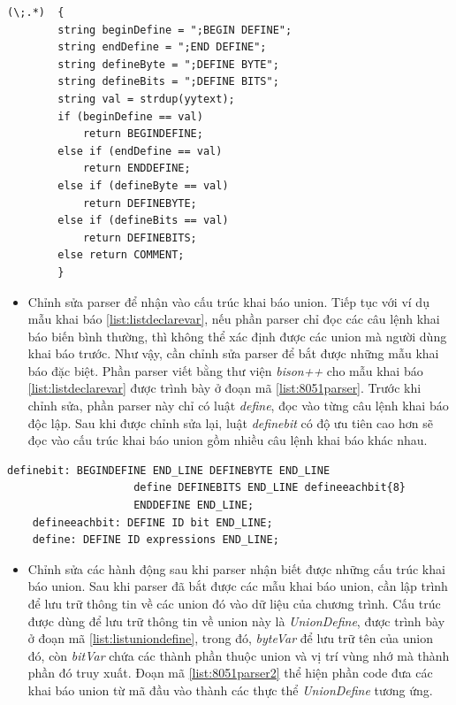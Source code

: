 \begin{changemargin}{0cm}{0cm} 
	\begin{lstlisting}[caption={Phần lexer được chỉnh sửa để nhận biết các chú thích đặc biệt},label={list:8051lexer}]
	(\;.*)  { 
		string beginDefine = ";BEGIN DEFINE";
		string endDefine = ";END DEFINE";
		string defineByte = ";DEFINE BYTE";
		string defineBits = ";DEFINE BITS";
		string val = strdup(yytext);
		if (beginDefine == val)
			return BEGINDEFINE;
		else if (endDefine == val)
			return ENDDEFINE;
		else if (defineByte == val)
			return DEFINEBYTE;
		else if (defineBits == val)
			return DEFINEBITS;
		else return COMMENT;
		}
	\end{lstlisting}

\end{changemargin} 
\begin{itemize}
	\item Chỉnh sửa parser để nhận vào cấu trúc khai báo union. Tiếp tục với ví dụ mẫu khai báo \ref{list:listdeclarevar}, nếu phần parser chỉ đọc các câu lệnh khai báo biến bình thường, thì không thể xác định được các union mà người dùng khai báo trước. Như vậy, cần chỉnh sửa parser để bắt được những mẫu khai báo đặc biệt. Phần parser viết bằng thư viện \textit{bison++} cho mẫu khai báo \ref{list:listdeclarevar} được trình bày ở đoạn mã \ref{list:8051parser}. Trước khi chỉnh sửa, phần parser này chỉ có luật \textit{define}, đọc vào từng câu lệnh khai báo độc lập. Sau khi được chỉnh sửa lại, luật \textit{definebit} có độ ưu tiên cao hơn sẽ đọc vào cấu trúc khai báo union gồm nhiều câu lệnh khai báo khác nhau.
\end{itemize}
\begin{changemargin}{0cm}{0cm} 
	\begin{lstlisting}[caption={Đoạn mã parser nhận biết các mẫu khai báo union},label={list:8051parser}]
	definebit: BEGINDEFINE END_LINE DEFINEBYTE END_LINE 
					define DEFINEBITS END_LINE defineeachbit{8} 
					ENDDEFINE END_LINE;
	defineeachbit: DEFINE ID bit END_LINE;
	define:	DEFINE ID expressions END_LINE;
	\end{lstlisting}
\end{changemargin} 
\begin{itemize}
	\item Chỉnh sửa các hành động sau khi parser nhận biết được những cấu trúc khai báo union. Sau khi parser đã bắt được các mẫu khai báo union, cần lập trình để lưu trữ thông tin về các union đó vào dữ liệu của chương trình. Cấu trúc được dùng để lưu trữ thông tin về union này là \textit{UnionDefine}, được trình bày ở đoạn mã \ref{list:listuniondefine}, trong đó, \textit{byteVar} để lưu trữ tên của union đó, còn \textit{bitVar} chứa các thành phần thuộc union và vị trí vùng nhớ mà thành phần đó truy xuất. Đoạn mã \ref{list:8051parser2} thể hiện phần code đưa các khai báo union từ mã đầu vào thành các thực thể \textit{UnionDefine} tương ứng.
\end{itemize}
